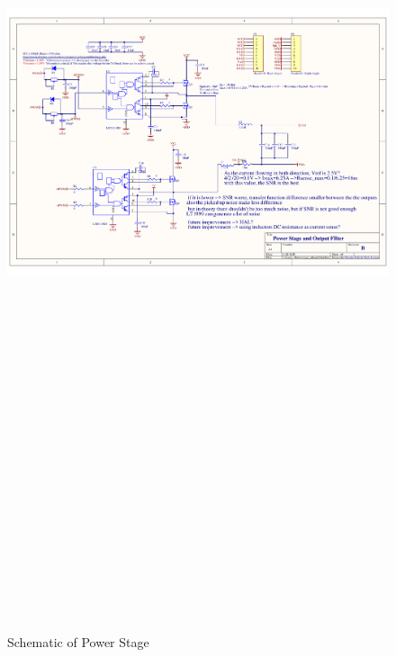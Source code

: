 \clearpage
\begin{landscape}
	\begin{figure}[hbtp]
		\centering
		\includegraphics[width=20cm,height=28.7cm,keepaspectratio]{0_Figures/Appendix/Power_Stage_Schematic.pdf}
		\caption{Schematic of Power Stage \cite{multivar_ctrl_loops_for_SM_audio_systems}}
		\label{fig:schematic_power_stage}
	\end{figure}
\end{landscape}
